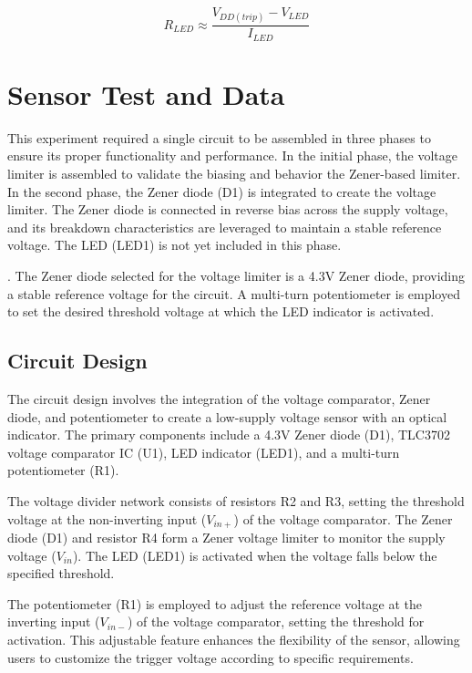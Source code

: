 \documentclass[conference]{IEEEtran}
\begin{document}
\begin{equation}
R_{LED} \approx \frac{V_{DD(trip)} - V_{LED}}{I_{LED}}\label{eq_4}
\end{equation}

\section{Sensor Test and Data}

This experiment required a single circuit to be assembled in three phases to ensure its proper functionality and performance. In the initial phase, the voltage limiter is assembled to validate the biasing and behavior the Zener-based limiter. In the second phase, the Zener diode (D1) is integrated to create the voltage limiter. The Zener diode is connected in reverse bias across the supply voltage, and its breakdown characteristics are leveraged to maintain a stable reference voltage. The LED (LED1) is not yet included in this phase.

. The Zener diode selected for the voltage limiter is a 4.3V Zener diode, providing a stable reference voltage for the circuit. A multi-turn potentiometer is employed to set the desired threshold voltage at which the LED indicator is activated.

\subsection{Circuit Design}

The circuit design involves the integration of the voltage comparator, Zener diode, and potentiometer to create a low-supply voltage sensor with an optical indicator. The primary components include a 4.3V Zener diode (D1), TLC3702 voltage comparator IC (U1), LED indicator (LED1), and a multi-turn potentiometer (R1).

The voltage divider network consists of resistors R2 and R3, setting the threshold voltage at the non-inverting input ($V_{in+}$) of the voltage comparator. The Zener diode (D1) and resistor R4 form a Zener voltage limiter to monitor the supply voltage ($V_{in}$). The LED (LED1) is activated when the voltage falls below the specified threshold.

The potentiometer (R1) is employed to adjust the reference voltage at the inverting input ($V_{in-}$) of the voltage comparator, setting the threshold for activation. This adjustable feature enhances the flexibility of the sensor, allowing users to customize the trigger voltage according to specific requirements.
\end{document}
